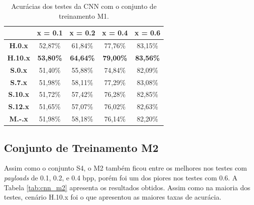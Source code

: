 \begin{table}[!htb]
\centering
\begin{tabular}{c|c|c|c|c|}
\cline{2-5}
\textbf{}                             & \textbf{x = 0.1} & \textbf{x = 0.2} & \textbf{x = 0.4} & \textbf{x = 0.6} \\ \hline
\multicolumn{1}{|c|}{\textbf{H.0.x}}  & 52,87\%          & 61,84\%          & 77,76\%          & 83,15\%          \\ \hline
\multicolumn{1}{|c|}{\textbf{H.10.x}} & \textbf{53,80\%} & \textbf{64,64\%} & \textbf{79,00\%} & \textbf{83,56\%} \\ \hline
\multicolumn{1}{|c|}{\textbf{S.0.x}}  & 51,40\%          & 55,88\%          & 74,84\%          & 82,09\%          \\ \hline
\multicolumn{1}{|c|}{\textbf{S.7.x}}  & 51,98\%          & 58,11\%          & 77,29\%          & 83,08\%          \\ \hline
\multicolumn{1}{|c|}{\textbf{S.10.x}} & 51,72\%          & 57,42\%          & 76,28\%          & 82,85\%          \\ \hline
\multicolumn{1}{|c|}{\textbf{S.12.x}} & 51,65\%          & 57,07\%          & 76,02\%          & 82,63\%          \\ \hline
\multicolumn{1}{|c|}{\textbf{M.-.x}}  & 51,98\%          & 58,18\%          & 76,14\%          & 82,20\%          \\ \hline
\end{tabular}
\caption{Acurácias dos testes da CNN com o conjunto de treinamento M1.}
\label{tab:cnn_m1}
\end{table}

\subsection{Conjunto de Treinamento M2}

Assim como o conjunto S4, o M2 também ficou entre os melhores nos testes com \textit{payloads} de 0.1, 0.2, e 0.4 bpp, porém foi um dos piores nos testes com 0.6. A Tabela \ref{tab:cnn_m2} apresenta os resultados obtidos. Assim como na maioria dos testes, cenário H.10.x foi o que apresentou as maiores taxas de acurácia. 

